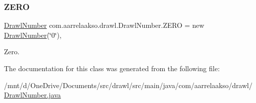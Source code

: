 \subsubsection{\texorpdfstring{Z\+E\+RO}{ZERO}}
{\footnotesize\ttfamily \hyperlink{classcom_1_1aarrelaakso_1_1drawl_1_1_drawl_number}{Drawl\+Number} com.\+aarrelaakso.\+drawl.\+Drawl\+Number.\+Z\+E\+RO = new \hyperlink{classcom_1_1aarrelaakso_1_1drawl_1_1_drawl_number}{Drawl\+Number}(\char`\"{}0\char`\"{})\hspace{0.3cm}{\ttfamily [static]}, {\ttfamily [protected]}}



Zero. 



The documentation for this class was generated from the following file\+:\begin{DoxyCompactItemize}
\item 
/mnt/d/\+One\+Drive/\+Documents/src/drawl/src/main/java/com/aarrelaakso/drawl/\hyperlink{_drawl_number_8java}{Drawl\+Number.\+java}\end{DoxyCompactItemize}
